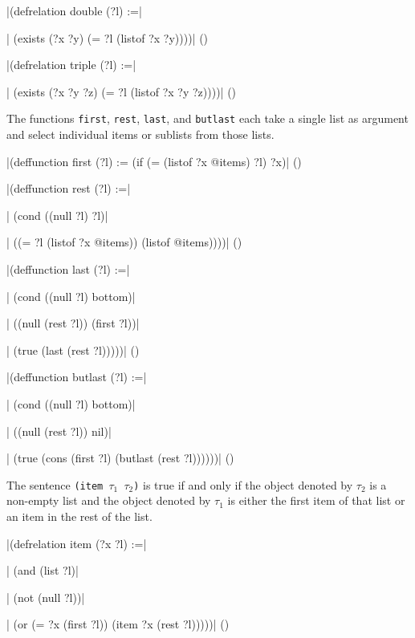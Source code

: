 \medskip
\verbatim|(defrelation double (?l) :=|\par
\verbatim|  (exists (?x ?y) (= ?l (listof ?x ?y))))|
\hfill(\equation)\par
\medskip

\medskip
\verbatim|(defrelation triple (?l) :=|\par
\verbatim|  (exists (?x ?y ?z) (= ?l (listof ?x ?y ?z))))|
\hfill(\equation)\par
\medskip

The functions {\tt first}, {\tt rest}, {\tt last}, and {\tt butlast} each
take a single list as argument and select individual items or sublists from
those lists.

\medskip
\verbatim|(deffunction first (?l) := (if (= (listof ?x @items) ?l) ?x)|
\hfill(\equation)\par \medskip

\medskip
\verbatim|(deffunction rest (?l) :=|\par
\verbatim|  (cond ((null ?l) ?l)|\par
\verbatim|        ((= ?l (listof ?x @items)) (listof @items))))|
\hfill(\equation)\par
\medskip

\medskip
\verbatim|(deffunction last (?l) :=|\par\nobreak
\verbatim|  (cond ((null ?l) bottom)|\par\nobreak
\verbatim|        ((null (rest ?l)) (first ?l))|\par\nobreak
\verbatim|        (true (last (rest ?l)))))|
\hfill(\equation)\par
\medskip

\medskip
\verbatim|(deffunction butlast (?l) :=|\par
\verbatim|  (cond ((null ?l) bottom)|\par
\verbatim|        ((null (rest ?l)) nil)|\par
\verbatim|        (true (cons (first ?l) (butlast (rest ?l))))))|
\hfill(\equation)\par \medskip

The sentence {\tt (item $\tau_1$ $\tau_2$)} is true if and only if
the object denoted by $\tau_2$ is a non-empty list and the object
denoted by $\tau_1$ is either the first item of that list or an item in
the rest of the list.

\medskip
\verbatim|(defrelation item (?x ?l) :=|\par
\verbatim|  (and (list ?l)|\par
\verbatim|       (not (null ?l))|\par
\verbatim|       (or (= ?x (first ?l)) (item ?x (rest ?l)))))|
\hfill(\equation)\par
\medskip

